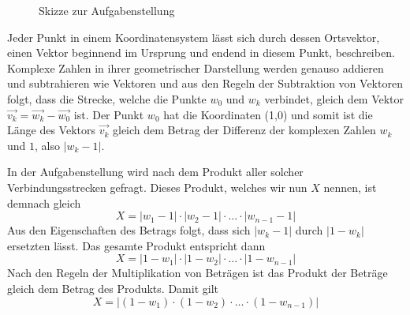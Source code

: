 \documentclass[a4paper,12pt]{article} %
\begin{document}
\begin{figure}
\begin{center}
		
		
		\caption{Skizze zur Aufgabenstellung}
		
		
	\end{center}
\end{figure}




Jeder Punkt in einem Koordinatensystem lässt sich durch dessen Ortsvektor, einen Vektor beginnend im Ursprung und endend in diesem Punkt, beschreiben. Komplexe Zahlen in ihrer geometrischer Darstellung werden genauso addieren und subtrahieren wie Vektoren und aus den Regeln der Subtraktion von Vektoren folgt, dass die Strecke, welche die Punkte $w_0$ und $w_k$ verbindet, gleich dem Vektor $\vec{v_k}=\vec{w_k}-\vec{w_0}$ ist.
Der Punkt $w_0$ hat die Koordinaten (1,0) und somit ist die Länge des Vektors $\vec{v_k}$ gleich dem Betrag der Differenz der komplexen Zahlen $w_k$ und $1$, also $|w_k-1|$.


In der Aufgabenstellung wird nach dem Produkt aller solcher Verbindungsstrecken gefragt.
Dieses Produkt, welches wir nun $X$ nennen, ist demnach gleich
\[X = |w_1-1|\cdot|w_2-1|\cdot\ldots\cdot|w_{n-1}-1|\]
Aus den Eigenschaften des Betrags folgt, dass sich $|w_k-1|$ durch $|1-w_k|$ ersetzten lässt.
Das gesamte Produkt entspricht dann
\[X=|1-w_1|\cdot|1-w_2|\cdot\ldots\cdot|1-w_{n-1}|\]
Nach den Regeln der Multiplikation von Beträgen ist das Produkt der Beträge gleich dem Betrag des Produkts. Damit gilt
\begin{equation}\label{X}
	X=|(1-w_1)\cdot(1-w_2)\cdot\ldots\cdot(1-w_{n-1})|
\end{equation}
\end{document}
